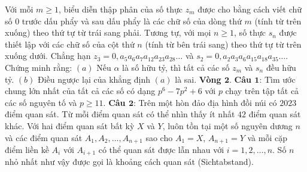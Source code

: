 \begin{multicols}{2}
\begin{figure}[H]
		\vspace*{-5pt}
	\end{figure}
	Với mỗi $m \ge 1$, biểu diễn thập phân của số thực $z_m$ được cho bằng cách viết chữ số $0$ trước dấu phẩy và sau dấu phẩy là các chữ số của dòng thứ $m$ (tính từ trên xuống) theo thứ tự từ trái sang phải. Tương tự, với mọi $n \ge 1$, số thực $s_n$ được thiết lập với các chữ số của cột thứ $n$ (tính từ bên trái sang) theo thứ tự từ trên xuống dưới. Chẳng hạn $z_3 = 0, a_5a_6a_7a_{12}a_{23}a_{28}\ldots$ và $s_2 = 0,a_2a_3a_6a_{15}a_{18}a_{35}\ldots$. Chứng minh rằng:
	\vskip 0.1cm
	$(a)$ Nếu $\alpha$ là số hữu tỷ, thì tất cả các số $z_m$ và $s_n$ đều hữu tỷ.
	\vskip 0.1cm
	$(b)$ Điều ngược lại của khẳng định $(a)$ là sai.
	\vskip 0.1cm
	\textbf{\color{cackithi}Vòng $\pmb{2.}$}
	\vskip 0.1cm
	\textbf{\color{cackithi}Câu $\pmb{1}$}: Tìm ước chung lớn nhất của tất cả các số có dạng $p^6 - 7p^2 +6$ với $p$ chạy trên tập tất cả các số nguyên tố và $p \ge 11$.
	\vskip 0.1cm
	\textbf{\color{cackithi}Câu $\pmb{2}$}: Trên một hòn đảo địa hình đồi núi có $2023$ điểm quan sát. Từ mỗi điểm quan sát có thể nhìn thấy ít nhất $42$ điểm quan sát khác. Với hai điểm quan sát bất kỳ $X$ và $Y$, luôn tồn tại một số nguyên dương $n$ và các điểm quan sát $A_1,  A_2, \ldots, A_{n+1}$ sao cho $A_1 = X$, $A_{n+1} = Y$ và mỗi cặp điểm liền kề $A_i$ với $A_{i+1}$ có thể quan sát được lẫn nhau với $i = 1, 2, \ldots, n$. Số $n$ nhỏ nhất như vậy được gọi là khoảng cách quan sát (Sichtabstand). 

\end{multicols}

